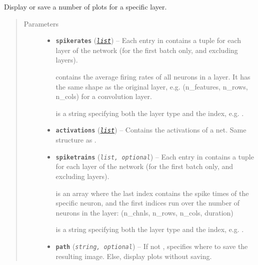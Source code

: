 \documentclass[letterpaper,10pt,english]{sphinxmanual}
\begin{document}
\begin{fulllineitems}
\label{snntoolbox.io_utils:snntoolbox.io_utils.plotting.plot_layer_summaries}
Display or save a number of plots for a specific layer.
\begin{quote}\begin{description}
\item[{Parameters}] \leavevmode\begin{itemize}
\item {} 
\textbf{\texttt{spikerates}} (\href{https://docs.python.org/library/functions.html\#list}{\emph{\texttt{list}}}) -- 
Each entry in  contains a tuple  for
each layer of the network (for the first batch only, and excluding
 layers).

 contains the average firing rates of all neurons in a layer.
It has the same shape as the original layer, e.g.
(n\_features, n\_rows, n\_cols) for a convolution layer.

 is a string specifying both the layer type and the index,
e.g. .


\item {} 
\textbf{\texttt{activations}} (\href{https://docs.python.org/library/functions.html\#list}{\emph{\texttt{list}}}) -- Contains the activations of a net. Same structure as .

\item {} 
\textbf{\texttt{spiketrains}} (\emph{\texttt{list, optional}}) -- 
Each entry in  contains a tuple
 for each layer of the network (for the first
batch only, and excluding  layers).

 is an array where the last index contains the spike
times of the specific neuron, and the first indices run over the
number of neurons in the layer: (n\_chnls, n\_rows, n\_cols, duration)

 is a string specifying both the layer type and the index,
e.g. .


\item {} 
\textbf{\texttt{path}} (\emph{\texttt{string, optional}}) -- If not , specifies where to save the resulting image. Else,
display plots without saving.

\end{itemize}

\end{description}\end{quote}

\end{fulllineitems}
\end{document}
